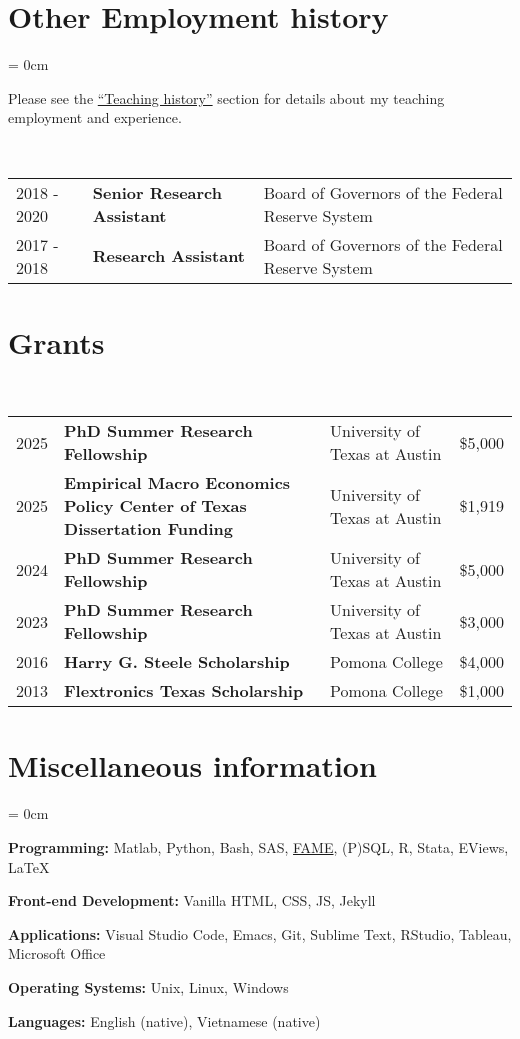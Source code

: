 \documentclass[a4paper, 10pt]{article}
\begin{document}
  \section{Other Employment history}
  \begin{compactitem}\parskip = 0cm
    \item Please see the {\hypersetup{linkcolor = black}\hyperref[sec:teaching_history]{``Teaching history''}} section for details about my teaching employment and experience.
  \end{compactitem}
  \vspace*{0.70em}
  ~\begin{tabular}{lll}
    2018 - 2020 & \textbf{Senior Research Assistant} & Board of Governors of the Federal Reserve System\\
    2017 - 2018 & \textbf{Research Assistant} & Board of Governors of the Federal Reserve System
  \end{tabular}
  \vspace*{0.25em}
      
  \section{Grants}
  ~\begin{tabular}{p{0.7cm} p{7.75cm} p{4.2cm} p{0.95cm}}
    2025 & \textbf{PhD Summer Research Fellowship} & University of Texas at Austin & \$5,000\\
    2025 & \textbf{Empirical Macro Economics Policy Center of Texas \newline Dissertation Funding} & University of Texas at Austin & \$1,919\\
    2024 & \textbf{PhD Summer Research Fellowship} & University of Texas at Austin & \$5,000\\
    2023 & \textbf{PhD Summer Research Fellowship} & University of Texas at Austin & \$3,000\\
    2016 & \textbf{Harry G. Steele Scholarship} & Pomona College & \$4,000\\
    2013 & \textbf{Flextronics Texas Scholarship} & Pomona College & \$1,000
  \end{tabular}
  \vspace*{0.25em}
    
  \section{Miscellaneous information}
  \begin{compactitem}\parskip = 0cm
    \item \textbf{Programming:} Matlab, Python, Bash, SAS, \href{https://en.wikipedia.org/wiki/FAME_(database)}{FAME}, (P)SQL, R, Stata, EViews, \LaTeX
    \item \textbf{Front-end Development:} Vanilla HTML, CSS, JS, Jekyll
    \item \textbf{Applications:} Visual Studio Code, Emacs, Git, Sublime Text, RStudio, Tableau, Microsoft Office
    \item \textbf{Operating Systems:} Unix, Linux, Windows
    \item \textbf{Languages:} English (native), Vietnamese (native)
  \end{compactitem}
\end{document}

